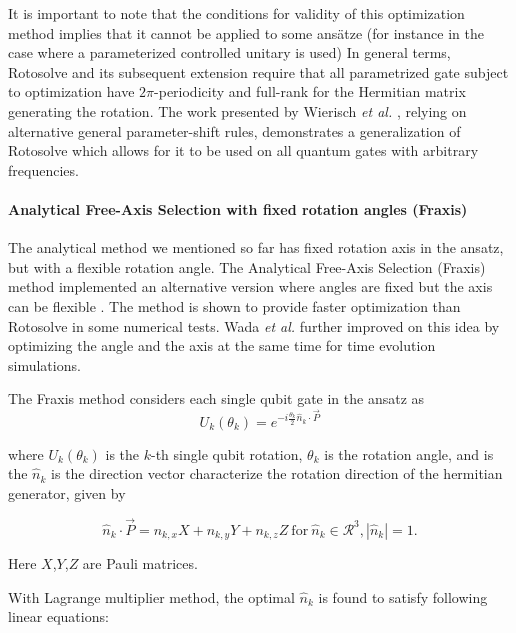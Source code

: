 It is important to note that the conditions for validity of this optimization method implies that it cannot be applied to some ans{\"{a}}tze (for instance in the case where a parameterized controlled unitary is used) In general terms, Rotosolve and its subsequent extension require that all parametrized gate subject to optimization have  $2\pi$-periodicity and full-rank for the Hermitian matrix generating the rotation. The work presented by Wierisch \textit{et al.} \cite{Wierichs2022}, relying on alternative general parameter-shift rules, demonstrates a generalization of Rotosolve which allows for it to be used on all quantum gates with arbitrary frequencies.

\paragraph{Analytical Free-Axis Selection with fixed rotation angles (Fraxis)}

The analytical method we mentioned so far has fixed rotation axis in the ansatz, but with a flexible rotation angle. The Analytical Free-Axis Selection (Fraxis) method implemented an alternative version where angles are fixed but the axis can be flexible \cite{Watanabe2021WatanabeOptimizingSelection}. The method is shown to provide faster optimization than Rotosolve in some numerical tests. Wada \textit{et al. } \cite{Wada2021SimulatingCircuits} further improved on this idea by optimizing the angle and the axis at the same time for time evolution simulations. 

The Fraxis method considers each single qubit gate in the ansatz as 
\begin{equation}
    U_k(\theta_k) = e^{-i\frac{\theta_k}{2}\hat{n}_k\cdot \Vec{P}}
\end{equation}

where $U_k(\theta_k)$ is the $k$-th single qubit rotation, $\theta_k$ is the rotation angle, and is the $\hat{n}_k$ is the direction vector characterize the rotation direction of the hermitian generator, given by  

\begin{equation}
    \hat{n}_k\cdot\Vec{P} =  n_{k,x}X + n_{k,y}Y + n_{k,z}Z \mathrm{~for~} \hat{n}_k \in \mathcal{R}^3, |\hat{n}_k| = 1.   
\end{equation}

Here $X$,$Y$,$Z$ are Pauli matrices.

With Lagrange multiplier method, the optimal $\hat{n}_k$ is found to satisfy following linear equations: 

